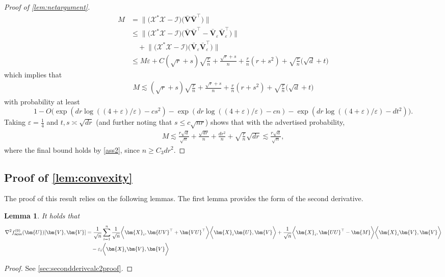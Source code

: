 \documentclass[10pt]{article}
\newcommand{\eps}{\ensuremath{\varepsilon}}
\newcommand{\s}{^*}
\renewcommand{\t}{^{\top}}
\newtheorem{lemma}{Lemma}
\theoremstyle{definition}
\begin{document}
\begin{proof}[Proof of \cref{lem:netargument}]
\begin{align}
M &= \bigg\| \bigg( \mathcal{X}\s \mathcal{X} - \mathcal{I} \bigg)  \big( \bm{ \bar V \bar V}\t \big) \bigg\| \\
&\leq  \bigg\| \bigg( \mathcal{X}\s \mathcal{X} - \mathcal{I} \bigg)  \big( \bm{ \bar V \bar V}\t - \bm{\bar V}_{\eps} \bm{\bar V}_{\eps}\t \big) \bigg\| \\
    &\quad + \bigg\| \bigg( \mathcal{X}\s \mathcal{X} - \mathcal{I} \bigg)  \big(  \bm{\bar V}_{\eps} \bm{\bar V}_{\eps}\t \big) \bigg\| \\
    &\leq  M \eps + C ( \sqrt{r} + s ) \sqrt{\frac{r}{n}} + \frac{\sqrt{r}  + s }{n} + \frac{r}{n} ( r + s^2) + \sqrt{\frac{r}{n}} \bigg( \sqrt{d} + t \bigg)
\end{align}
which implies that
\begin{align}
    M \lesssim ( \sqrt{r} + s ) \sqrt{\frac{r}{n}} + \frac{\sqrt{r}  + s }{n} + \frac{r}{n} ( r + s^2) + \sqrt{\frac{r}{n}} \bigg( \sqrt{d} + t \bigg)
\end{align}
with probability at least $$1 - O\bigg( \exp( dr \log( (4+\eps)/\eps) -c s^2) - \exp( dr \log( (4+\eps)/\eps) - c n) - \exp( dr \log( (4+\eps)/\eps) - d t^2) \bigg) .$$  Taking $\eps = \frac{1}{4}$ and $t, s \asymp \sqrt{dr}$ (and further noting that $s \leq c \sqrt{nr}$) shows that with the advertised probability,
\begin{align*}
    M \lesssim \frac{r \sqrt{d}}{\sqrt{n}} + \frac{\sqrt{dr}}{n} + \frac{d r^2}{n}  + \sqrt{\frac{r}{n}} \sqrt{dr} \lesssim \frac{r \sqrt{d}}{\sqrt{n}},
\end{align*}
where the final bound holds by \cref{ass2}, since $n \geq C_3 d r^2$.  
\end{proof}

\subsection{Proof of \cref{lem:convexity}} \label{sec:landscapeproof}
The proof of this result relies on the following lemmas.  The first lemma provides the form of the second derivative.
\begin{lemma} \label{lem:secondderivcalc2}
    It holds that
    \begin{align}
      \nabla^2 f^{(0)}_{{\sf ncvx}}(\bm{U})[ \bm{V}, \bm{V}] &= \frac{1}{\sqrt{n}} \sum_{i=1}^{n}\frac{1}{\sqrt{n}} \bigg \langle \bm{X}_i, \bm{U V}\t + \bm{VU}\t  \bigg \rangle \bigg \langle \bm{X}_i \bm{U}, \bm{V} \bigg \rangle + \frac{1}{\sqrt{n}}\bigg \langle \bm{X}_i , \bm{UU}\t - \bm{M} \bigg \rangle \bigg \langle \bm{X}_i \bm{V}, \bm{V} \bigg \rangle  \\
    &\quad - \eps_i \bigg \langle \bm{X}_i \bm{V}, \bm{V} \bigg \rangle 
    \end{align}
\end{lemma}
\begin{proof}
    See \cref{sec:secondderivcalc2proof}.
\end{proof}
\end{document}
